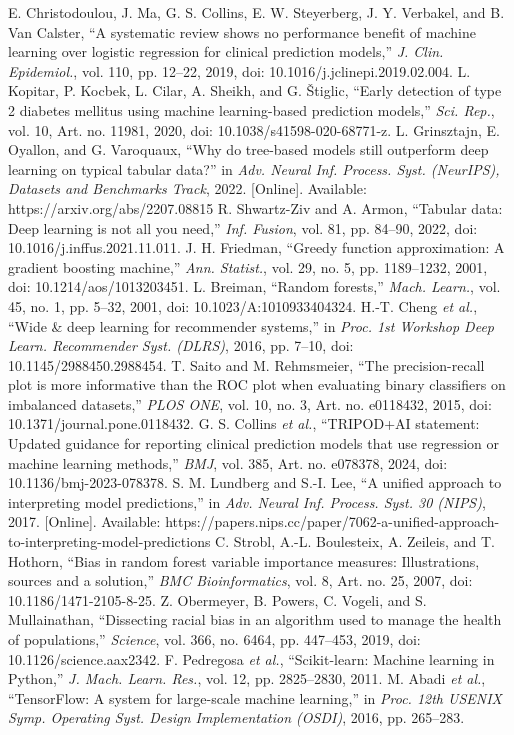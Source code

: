  E. Christodoulou, J. Ma, G. S. Collins, E. W. Steyerberg, J. Y. Verbakel, and B. Van Calster, ``A systematic review shows no performance benefit of machine learning over logistic regression for clinical prediction models,'' \emph{J. Clin. Epidemiol.}, vol. 110, pp. 12--22, 2019, doi: 10.1016/j.jclinepi.2019.02.004.
 L. Kopitar, P. Kocbek, L. Cilar, A. Sheikh, and G. \v{S}tiglic, ``Early detection of type 2 diabetes mellitus using machine learning-based prediction models,'' \emph{Sci. Rep.}, vol. 10, Art. no. 11981, 2020, doi: 10.1038/s41598-020-68771-z.
 L. Grinsztajn, E. Oyallon, and G. Varoquaux, ``Why do tree-based models still outperform deep learning on typical tabular data?'' in \emph{Adv. Neural Inf. Process. Syst. (NeurIPS), Datasets and Benchmarks Track}, 2022. [Online]. Available: https://arxiv.org/abs/2207.08815
 R. Shwartz-Ziv and A. Armon, ``Tabular data: Deep learning is not all you need,'' \emph{Inf. Fusion}, vol. 81, pp. 84--90, 2022, doi: 10.1016/j.inffus.2021.11.011.
 J. H. Friedman, ``Greedy function approximation: A gradient boosting machine,'' \emph{Ann. Statist.}, vol. 29, no. 5, pp. 1189--1232, 2001, doi: 10.1214/aos/1013203451.
 L. Breiman, ``Random forests,'' \emph{Mach. Learn.}, vol. 45, no. 1, pp. 5--32, 2001, doi: 10.1023/A:1010933404324.
 H.-T. Cheng \emph{et al.}, ``Wide \& deep learning for recommender systems,'' in \emph{Proc. 1st Workshop Deep Learn. Recommender Syst. (DLRS)}, 2016, pp. 7--10, doi: 10.1145/2988450.2988454.
 T. Saito and M. Rehmsmeier, ``The precision-recall plot is more informative than the ROC plot when evaluating binary classifiers on imbalanced datasets,'' \emph{PLOS ONE}, vol. 10, no. 3, Art. no. e0118432, 2015, doi: 10.1371/journal.pone.0118432.
 G. S. Collins \emph{et al.}, ``TRIPOD+AI statement: Updated guidance for reporting clinical prediction models that use regression or machine learning methods,'' \emph{BMJ}, vol. 385, Art. no. e078378, 2024, doi: 10.1136/bmj-2023-078378.
 S. M. Lundberg and S.-I. Lee, ``A unified approach to interpreting model predictions,'' in \emph{Adv. Neural Inf. Process. Syst. 30 (NIPS)}, 2017. [Online]. Available: https://papers.nips.cc/paper/7062-a-unified-approach-to-interpreting-model-predictions
 C. Strobl, A.-L. Boulesteix, A. Zeileis, and T. Hothorn, ``Bias in random forest variable importance measures: Illustrations, sources and a solution,'' \emph{BMC Bioinformatics}, vol. 8, Art. no. 25, 2007, doi: 10.1186/1471-2105-8-25.
 Z. Obermeyer, B. Powers, C. Vogeli, and S. Mullainathan, ``Dissecting racial bias in an algorithm used to manage the health of populations,'' \emph{Science}, vol. 366, no. 6464, pp. 447--453, 2019, doi: 10.1126/science.aax2342.
 F. Pedregosa \emph{et al.}, ``Scikit-learn: Machine learning in Python,'' \emph{J. Mach. Learn. Res.}, vol. 12, pp. 2825--2830, 2011.
 M. Abadi \emph{et al.}, ``TensorFlow: A system for large-scale machine learning,'' in \emph{Proc. 12th USENIX Symp. Operating Syst. Design Implementation (OSDI)}, 2016, pp. 265--283.
